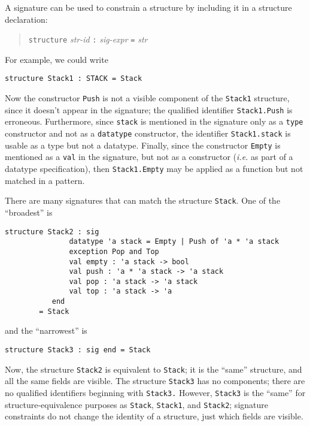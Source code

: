 A signature can be used to constrain a structure by including it in a
structure declaration:
\begin{quote}
\verb"structure" {\it str-id} \verb":" {\it sig-expr} \verb"=" {\it str}
\end{quote}
For example, we could write
\begin{verbatim}
structure Stack1 : STACK = Stack
\end{verbatim}
Now the constructor \verb"Push" is not a visible component of the
\verb"Stack1" structure, since it doesn't appear in the signature;
the qualified identifier \verb"Stack1.Push" is erroneous.
Furthermore, since \verb"stack" is mentioned in the signature only as
a \verb"type" constructor and not as a \verb"datatype" constructor,
the identifier \verb"Stack1.stack" is usable as a type but not a datatype.
Finally, since the constructor \verb"Empty" is mentioned as a
\verb"val" in the signature, but not as a constructor ({\it i.e.} as
part of a datatype specification), then \verb"Stack1.Empty" may be
applied as a function but not matched in a pattern.

There are many signatures that can match the structure \verb"Stack".
One of the ``broadest'' is
\begin{verbatim}
structure Stack2 : sig
		       datatype 'a stack = Empty | Push of 'a * 'a stack
		       exception Pop and Top
		       val empty : 'a stack -> bool
		       val push : 'a * 'a stack -> 'a stack
		       val pop : 'a stack -> 'a stack
		       val top : 'a stack -> 'a
		   end
		= Stack
\end{verbatim}
and the ``narrowest'' is
\begin{verbatim}
structure Stack3 : sig end = Stack
\end{verbatim}
Now, the structure \verb"Stack2" is equivalent to \verb"Stack"; it is
the ``same'' structure, and all the same fields are visible.  The
structure \verb"Stack3" has no components; there are no qualified
identifiers beginning with \verb"Stack3."  However, \verb"Stack3" is
the ``same'' for structure-equivalence purposes as \verb"Stack",
\verb"Stack1", and \verb"Stack2"; signature constraints do not change
the identity of a structure, just which fields are visible.

